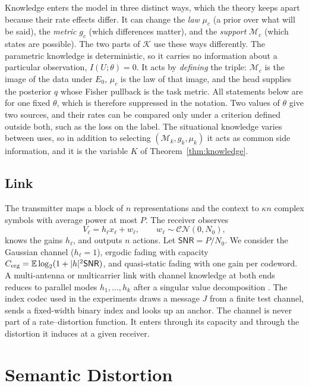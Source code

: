\documentclass[10pt,journal]{IEEEtran}
\newcommand{\E}{\mathbb E}
\newcommand{\M}{\mathcal M}
\newcommand{\snr}{\mathsf{SNR}}
\begin{document}
Knowledge enters the model in three distinct ways, which the theory keeps apart because their rate effects differ. It can change the \emph{law} $\mu_c$ (a prior over what will be said), the \emph{metric} $g_c$ (which differences matter), and the \emph{support} $\M_c$ (which states are possible). The two parts of $\mathcal K$ use these ways differently. The parametric knowledge is deterministic, so it carries no information about a particular observation, $I(U;\theta)=0$. It acts by \emph{defining} the triple: $\M_c$ is the image of the data under $E_0$, $\mu_c$ is the law of that image, and the head supplies the posterior $q$ whose Fisher pullback is the task metric. All statements below are for one fixed $\theta$, which is therefore suppressed in the notation. Two values of $\theta$ give two sources, and their rates can be compared only under a criterion defined outside both, such as the loss on the label. The situational knowledge varies between uses, so in addition to selecting $(\M_k,g_k,\mu_k)$ it acts as common side information, and it is the variable $K$ of Theorem~\ref{thm:knowledge}.

\subsection{Link}
The transmitter maps a block of $n$ representations and the context to $\kappa n$ complex symbols with average power at most $P$. The receiver observes
\begin{equation}
 V_\ell=h_\ell x_\ell+w_\ell,\qquad w_\ell\sim\mathcal{CN}(0,N_0), \label{eq:channel}
\end{equation}
knows the gains $h_\ell$, and outputs $n$ actions. Let $\snr=P/N_0$. We consider the Gaussian channel ($h_\ell=1$), ergodic fading with capacity $C_{\rm erg}=\E\log_2(1+|h|^2\snr)$, and quasi-static fading with one gain per codeword. A multi-antenna or multicarrier link with channel knowledge at both ends reduces to parallel modes $h_1,\dots,h_k$ after a singular value decomposition \cite{tse2005fundamentals}. The index codec used in the experiments draws a message $J$ from a finite test channel, sends a fixed-width binary index and looks up an anchor. The channel is never part of a rate--distortion function. It enters through its capacity and through the distortion it induces at a given receiver.

\section{Semantic Distortion}\label{sec:distortion}
\end{document}
